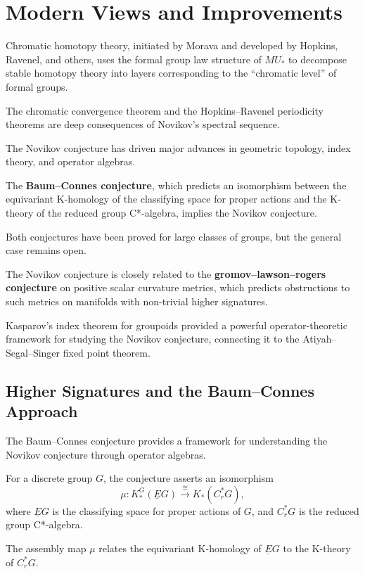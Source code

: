 \section{Modern Views and Improvements}

Chromatic homotopy theory, initiated by Morava and developed by Hopkins, Ravenel, and others, uses the formal group law structure of $MU_*$ to decompose stable homotopy theory into layers corresponding to the ``chromatic level'' of formal groups.

The chromatic convergence theorem and the Hopkins--Ravenel periodicity theorems are deep consequences of Novikov's spectral sequence.

The Novikov conjecture has driven major advances in geometric topology, index theory, and operator algebras.

The \textbf{Baum--Connes conjecture}, which predicts an isomorphism between the equivariant K-homology of the classifying space for proper actions and the K-theory of the reduced group C*-algebra, implies the Novikov conjecture.

Both conjectures have been proved for large classes of groups, but the general case remains open.

The Novikov conjecture is closely related to the \textbf{gromov--lawson--rogers conjecture} on positive scalar curvature metrics, which predicts obstructions to such metrics on manifolds with non-trivial higher signatures.

Kasparov's index theorem for groupoids provided a powerful operator-theoretic framework for studying the Novikov conjecture, connecting it to the Atiyah--Segal--Singer fixed point theorem.

\subsection*{Higher Signatures and the Baum--Connes Approach}

The Baum--Connes conjecture provides a framework for understanding the Novikov conjecture through operator algebras.

For a discrete group $G$, the conjecture asserts an isomorphism
\[
\mu: K_*^G(\underline{E}G) \xrightarrow{\cong} K_*(C_r^*G),
\]
where $\underline{E}G$ is the classifying space for proper actions of $G$, and $C_r^*G$ is the reduced group C*-algebra.

The assembly map $\mu$ relates the equivariant K-homology of $\underline{E}G$ to the K-theory of $C_r^*G$.

